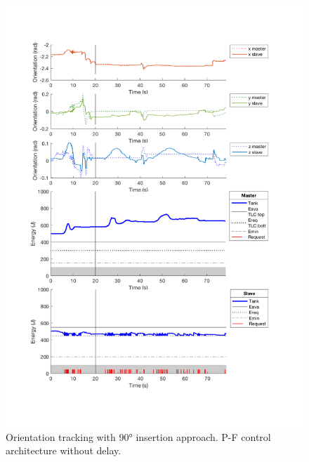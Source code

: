 \begin{center}
	\begin{figure}
		\includegraphics[width=\textwidth, keepaspectratio]{plots/pf90/Orientation.pdf}
		\caption{Orientation tracking with 90° insertion approach. P-F control architecture without delay.}
		\label{graph:pf90/Orientation}
	\end{figure}
\end{center}
